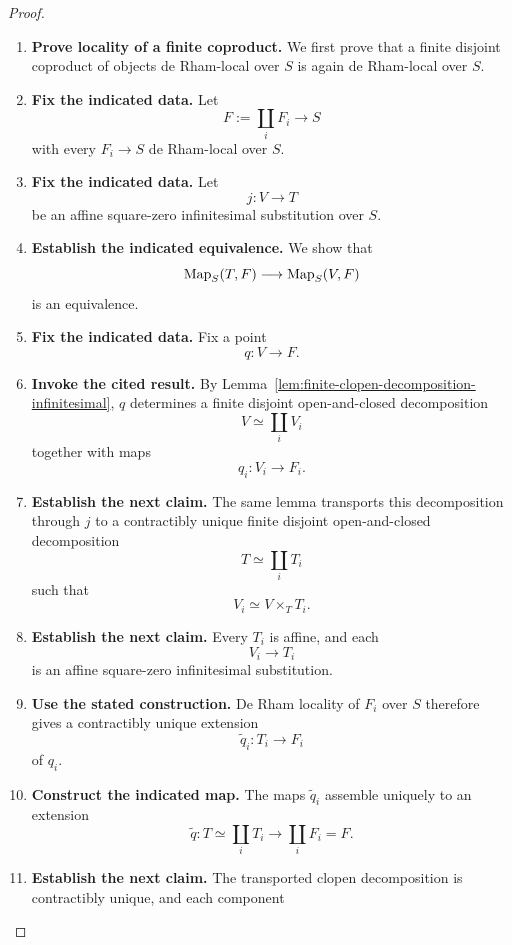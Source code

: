 \begin{proof}
\leavevmode
\begin{enumerate}[label=\textup{(\arabic*)}]
    \item \textbf{Prove locality of a finite coproduct.}
    We first prove that a finite disjoint coproduct of objects de Rham-local over \(S\) is
    again de Rham-local over \(S\).
    \item \textbf{Fix the indicated data.}
    Let
    \[
    F:=\coprod_iF_i\longrightarrow S
    \]
    with every \(F_i\to S\) de Rham-local over \(S\).
    \item \textbf{Fix the indicated data.}
    Let
    \[
    j:V\longrightarrow T
    \]
    be an affine square-zero infinitesimal substitution over \(S\).
    \item \textbf{Establish the indicated equivalence.}
    We show that
    \[
    \operatorname{Map}_S(T,F)\longrightarrow\operatorname{Map}_S(V,F)
    \]
    is an equivalence.
    \item \textbf{Fix the indicated data.}
    Fix a point
    \[
    q:V\longrightarrow F.
    \]
    \item \textbf{Invoke the cited result.}
    By
    Lemma~\ref{lem:finite-clopen-decomposition-infinitesimal}, \(q\) determines a
    finite disjoint open-and-closed decomposition
    \[
    V\simeq\coprod_iV_i
    \]
    together with maps
    \[
    q_i:V_i\longrightarrow F_i.
    \]
    \item \textbf{Establish the next claim.}
    The same lemma transports this decomposition through \(j\) to a contractibly unique
    finite disjoint open-and-closed decomposition
    \[
    T\simeq\coprod_iT_i
    \]
    such that
    \[
    V_i\simeq V\times_TT_i.
    \]
    \item \textbf{Establish the next claim.}
    Every \(T_i\) is affine, and each
    \[
    V_i\longrightarrow T_i
    \]
    is an affine square-zero infinitesimal substitution.
    \item \textbf{Use the stated construction.}
    De Rham locality of \(F_i\) over \(S\) therefore gives a contractibly unique extension
    \[
    \widetilde q_i:T_i\longrightarrow F_i
    \]
    of \(q_i\).
    \item \textbf{Construct the indicated map.}
    The maps \(\widetilde q_i\) assemble uniquely to an extension
    \[
    \widetilde q:T\simeq\coprod_iT_i
    \longrightarrow
    \coprod_iF_i=F.
    \]
    \item \textbf{Establish the next claim.}
    The transported clopen decomposition is contractibly unique, and each component

\end{enumerate}
\end{proof}
